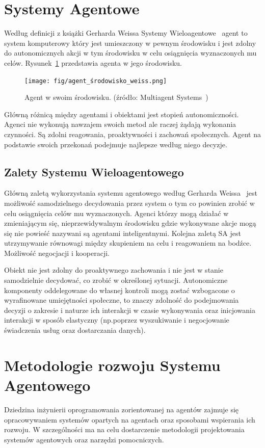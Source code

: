\documentclass[11pt]{report}
\begin{document}
    \section{Systemy Agentowe}\label{sec:systemy-agentowe}
    Według definicji z książki Gerharda Weissa Systemy Wieloagentowe~\cite{55066420130101} agent to system komputerowy który jest umieszczony w pewnym środowisku i jest zdolny do autonomicznych akcji w tym środowisku w celu osiągnięcia wyznaczonych mu celów.
    Rysunek~\ref{fig:agent} przedstawia agenta w jego środowisku.
    \begin{figure}[!htp]
        \centering
        \texttt{[image: fig/agent\_środowisko\_weiss.png]}
        \caption{Agent w swoim środowisku. (źródło: Multiagent Systems~\cite{55066420130101})}
        \label{fig:agent}
    \end{figure}
    Główną różnicą między agentami i obiektami jest stopień autonomiczności.
    Agenci nie wykonują nawzajem swoich metod ale raczej żądają wykonania czynności.
    Są zdolni reagowania, proaktywności i zachowań społecznych.
    Agent na podstawie swoich przekonań podejmuje najlepsze według niego decyzje.

    \subsection{Zalety Systemu Wieloagentowego}
    Główną zaletą wykorzystania systemu agentowego według Gerharda Weissa~\cite{55066420130101} jest możliwość samodzielnego decydowania przez system o tym co powinien zrobić w celu osiągnięcia celów mu wyznaczonych.
    Agenci którzy mogą działać w zmieniającym się, nieprzewidywalnym środowisku gdzie wykonywane akcje mogą się nie powieść nazywani są agentami inteligentnymi.
    Kolejna zaletą SA jest utrzymywanie równowagi między skupieniem na celu i reagowaniem na bodźce.
    Możliwość negocjacji i kooperacji.

    Obiekt nie jest zdolny do proaktywnego zachowania i nie jest w stanie samodzielnie decydować, co zrobić w określonej sytuacji.
    Autonomiczne komponenty oddelegowane do własnej kontroli mogą zostać wzbogacone o wyrafinowane umiejętności społeczne, to znaczy zdolność do podejmowania decyzji o zakresie i naturze ich interakcji w czasie wykonywania oraz inicjowania interakcji w sposób elastyczny (np.\@ poprzez wyszukiwanie i negocjowanie świadczenia usług oraz dostarczania danych).


    \section{Metodologie rozwoju Systemu Agentowego}\label{sec:metodologie-rozwoju-systemu-agentowego}
    Dziedzina inżynierii oprogramowania zorientowanej na agentów zajmuje się opracowywaniem systemów opartych na agentach oraz sposobami wspierania ich rozwoju.
    W szczególności ma na celu dostarczenie metodologii projektowania systemów agentowych oraz narzędzi pomocniczych.
\end{document}
